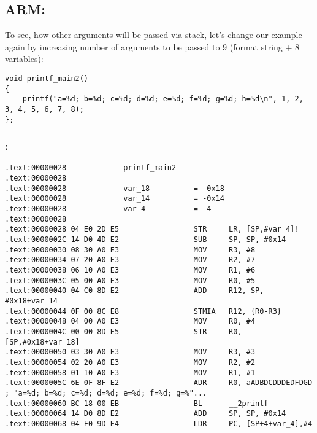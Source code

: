 ﻿\subsection{ARM: }

{To see,
how other arguments will be passed via stack, let's change our example again by increasing number of arguments
to be passed to 9 (\printf format string + 8 \Tint variables)}:

\begin{lstlisting}
void printf_main2()
{
	printf("a=%d; b=%d; c=%d; d=%d; e=%d; f=%d; g=%d; h=%d\n", 1, 2, 3, 4, 5, 6, 7, 8);
};
\end{lstlisting}

\subsubsection{\OptimizingKeil: \ARMMode}

\begin{lstlisting}
.text:00000028             printf_main2
.text:00000028
.text:00000028             var_18          = -0x18
.text:00000028             var_14          = -0x14
.text:00000028             var_4           = -4
.text:00000028
.text:00000028 04 E0 2D E5                 STR     LR, [SP,#var_4]!
.text:0000002C 14 D0 4D E2                 SUB     SP, SP, #0x14
.text:00000030 08 30 A0 E3                 MOV     R3, #8
.text:00000034 07 20 A0 E3                 MOV     R2, #7
.text:00000038 06 10 A0 E3                 MOV     R1, #6
.text:0000003C 05 00 A0 E3                 MOV     R0, #5
.text:00000040 04 C0 8D E2                 ADD     R12, SP, #0x18+var_14
.text:00000044 0F 00 8C E8                 STMIA   R12, {R0-R3}
.text:00000048 04 00 A0 E3                 MOV     R0, #4
.text:0000004C 00 00 8D E5                 STR     R0, [SP,#0x18+var_18]
.text:00000050 03 30 A0 E3                 MOV     R3, #3
.text:00000054 02 20 A0 E3                 MOV     R2, #2
.text:00000058 01 10 A0 E3                 MOV     R1, #1
.text:0000005C 6E 0F 8F E2                 ADR     R0, aADBDCDDDEDFDGD ; "a=%d; b=%d; c=%d; d=%d; e=%d; f=%d; g=%"...
.text:00000060 BC 18 00 EB                 BL      __2printf
.text:00000064 14 D0 8D E2                 ADD     SP, SP, #0x14
.text:00000068 04 F0 9D E4                 LDR     PC, [SP+4+var_4],#4
\end{lstlisting}

